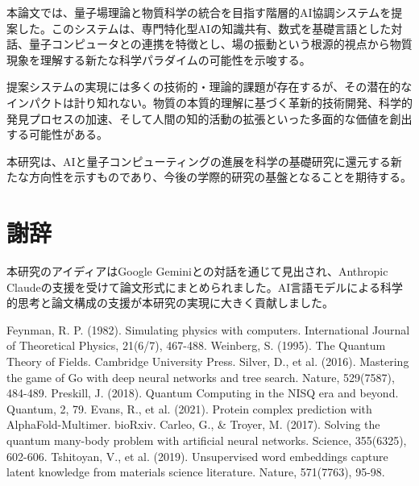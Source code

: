 \documentclass[12pt,a4paper]{article}
\begin{document}
本論文では、量子場理論と物質科学の統合を目指す階層的AI協調システムを提案した。このシステムは、専門特化型AIの知識共有、数式を基礎言語とした対話、量子コンピュータとの連携を特徴とし、場の振動という根源的視点から物質現象を理解する新たな科学パラダイムの可能性を示唆する。

提案システムの実現には多くの技術的・理論的課題が存在するが、その潜在的なインパクトは計り知れない。物質の本質的理解に基づく革新的技術開発、科学的発見プロセスの加速、そして人間の知的活動の拡張といった多面的な価値を創出する可能性がある。

本研究は、AIと量子コンピューティングの進展を科学の基礎研究に還元する新たな方向性を示すものであり、今後の学際的研究の基盤となることを期待する。

\section*{謝辞}
本研究のアイディアはGoogle Geminiとの対話を通じて見出され、Anthropic Claudeの支援を受けて論文形式にまとめられました。AI言語モデルによる科学的思考と論文構成の支援が本研究の実現に大きく貢献しました。


\begin{thebibliography}{99}
 Feynman, R. P. (1982). Simulating physics with computers. International Journal of Theoretical Physics, 21(6/7), 467-488.
 Weinberg, S. (1995). The Quantum Theory of Fields. Cambridge University Press.
 Silver, D., et al. (2016). Mastering the game of Go with deep neural networks and tree search. Nature, 529(7587), 484-489.
 Preskill, J. (2018). Quantum Computing in the NISQ era and beyond. Quantum, 2, 79.
 Evans, R., et al. (2021). Protein complex prediction with AlphaFold-Multimer. bioRxiv.
 Carleo, G., \& Troyer, M. (2017). Solving the quantum many-body problem with artificial neural networks. Science, 355(6325), 602-606.
 Tshitoyan, V., et al. (2019). Unsupervised word embeddings capture latent knowledge from materials science literature. Nature, 571(7763), 95-98.
\end{thebibliography}
\end{document}

